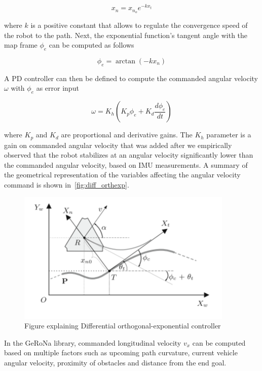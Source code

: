 \begin{equation}
\label{eq:exp_law}
	x_n = x_{n_o} e^{-k x_t}
\end{equation}

where $k$ is a positive constant that allows to regulate the convergence speed of the robot to the path.
Next, the exponential function's tangent angle with the map frame $\phi_e$ can be computed as follows

\begin{equation}
\label{eq:exp_angle}
\phi_e = \arctan(-k x_n)
\end{equation}

A PD controller can then be defined to compute the commanded angular velocity $\omega$ with $\phi_e$ as error input

\begin{equation}
\label{eq:exp_PD}
\omega = K_h (K_p \phi_e + K_d \frac{d\phi_e}{dt})
\end{equation}



where $K_p$ and $K_d$ are proportional and derivative gains. 
The $K_h$ parameter is a gain on commanded angular velocity that was added after we empirically observed that the robot stabilizes at an angular velocity significantly lower than the commanded angular velocity, based on \ac{IMU} measurements.
A summary of the geometrical representation of the variables affecting the angular velocity command is shown in~\autoref{fig:diff_orthexp}.

\begin{figure} [htpb]
	\centering
	\includegraphics[height=2.5in]{figs/orthexp.pdf}
	\caption{Figure explaining Differential orthogonal-exponential controller}
	\label{fig:diff_orthexp}
\end{figure}

In the \ac{GeRoNa} library, commanded longitudinal velocity $v_x$ can be computed based on multiple factors such as upcoming path curvature, current vehicle angular velocity, proximity of obstacles and distance from the end goal.



